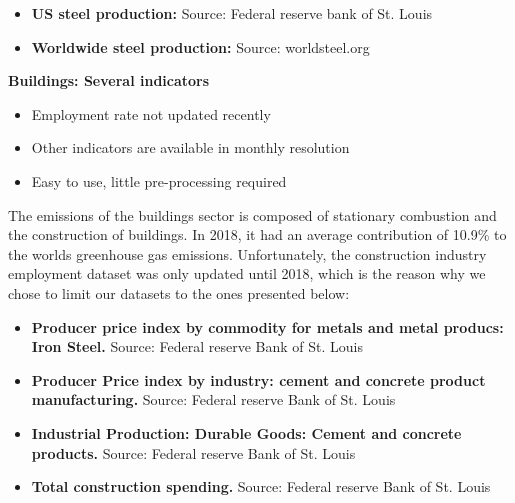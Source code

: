 \begin{itemize}
	\item \textbf{US steel production:} Source: Federal reserve bank of St. Louis
	\item \textbf{Worldwide steel production:} Source: worldsteel.org

\end{itemize}

\newpage

\vspace{1em}
\textbf{Buildings: Several indicators}
\begin{itemize}
	\item Employment rate not updated recently
	\item Other indicators are available in monthly resolution
	\item Easy to use, little pre-processing required
\end{itemize}
The emissions of the buildings sector is composed of stationary combustion and the construction of buildings. In 2018, it had an average contribution of 10.9\% to the worlds greenhouse gas emissions. 
Unfortunately, the construction industry employment dataset was only updated until 2018, which is the reason why we chose to limit our datasets to the ones presented below:

\begin{itemize}
	\item \textbf{Producer price index by commodity for metals and metal producs: Iron Steel.}
	Source: Federal reserve Bank of St. Louis 
	\item \textbf{Producer Price index by industry: cement and concrete product manufacturing.}
	Source:  Federal reserve Bank of St. Louis
	\item \textbf{Industrial Production: Durable Goods: Cement and concrete products.}
	Source:  Federal reserve Bank of St. Louis 
	\item \textbf{Total construction spending.}
	Source:  Federal reserve Bank of St. Louis
\end{itemize}

